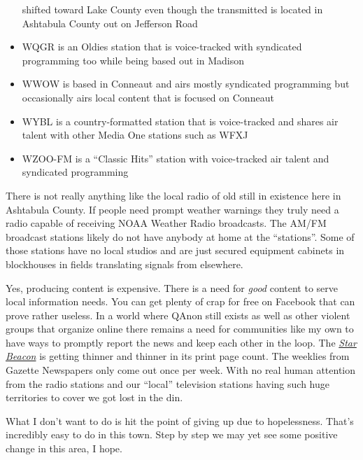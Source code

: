 \begin{itemize}
  shifted toward Lake County even though the transmitted is located in
  Ashtabula County out on Jefferson Road
\item
  WQGR is an Oldies station that is voice-tracked with syndicated
  programming too while being based out in Madison
\item
  WWOW is based in Conneaut and airs mostly syndicated programming but
  occasionally airs local content that is focused on Conneaut
\item
  WYBL is a country-formatted station that is voice-tracked and shares
  air talent with other Media One stations such as WFXJ
\item
  WZOO-FM is a ``Classic Hits'' station with voice-tracked air talent
  and syndicated programming
\end{itemize}

There is not really anything like the local radio of old still in
existence here in Ashtabula County. If people need prompt weather
warnings they truly need a radio capable of receiving NOAA Weather Radio
broadcasts. The AM/FM broadcast stations likely do not have anybody at
home at the ``stations''. Some of those stations have no local studios
and are just secured equipment cabinets in blockhouses in fields
translating signals from elsewhere.

Yes, producing content is expensive. There is a need for \emph{good}
content to serve local information needs. You can get plenty of crap for
free on Facebook that can prove rather useless. In a world where QAnon
still exists as well as other violent groups that organize online there
remains a need for communities like my own to have ways to promptly
report the news and keep each other in the loop. The
\href{https://www.starbeacon.com/}{\emph{Star Beacon}} is getting
thinner and thinner in its print page count. The weeklies from Gazette
Newspapers only come out once per week. With no real human attention
from the radio stations and our ``local'' television stations having
such huge territories to cover we got lost in the din.

What I don't want to do is hit the point of giving up due to
hopelessness. That's incredibly easy to do in this town. Step by step we
may yet see some positive change in this area, I hope.
